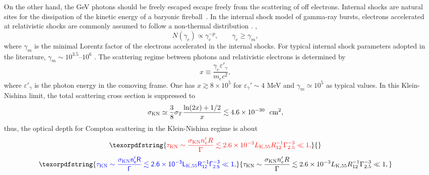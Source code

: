 \documentclass[prd,twocolumn,amsmath,amssymb,aps,linenumbers]{revtex4-2} %
\providecommand{\DIFaddtex}[1]{{\protect\color{blue} \sf #1}} %
\providecommand{\DIFdeltex}[1]{{\protect\color{red} \scriptsize #1}} %
\providecommand{\DIFaddbegin}{} %
\providecommand{\DIFaddend}{} %
\providecommand{\DIFdelbegin}{} %
\providecommand{\DIFdelend}{} %
\providecommand{\DIFadd}[1]{\texorpdfstring{\DIFaddtex{#1}}{#1}} %
\providecommand{\DIFdel}[1]{\texorpdfstring{\DIFdeltex{#1}}{}} %
\newcommand{\DIFscaledelfig}{0.5}
\newlength{\DIFdelgraphicswidth} %
\newlength{\DIFdelgraphicsheight} %
\newcommand{\DIFaddincludegraphics}[2][]{{\color{blue}\fbox{\DIFOincludegraphics[#1]{#2}}}} %
\newcommand{\DIFdelincludegraphics}[2][]{%
\sbox{\DIFdelgraphicsbox}{\DIFOincludegraphics[#1]{#2}}%
\settoboxwidth{\DIFdelgraphicswidth}{\DIFdelgraphicsbox} %
\settoboxtotalheight{\DIFdelgraphicsheight}{\DIFdelgraphicsbox} %
\scalebox{\DIFscaledelfig}{%
\parbox[b]{\DIFdelgraphicswidth}{\usebox{\DIFdelgraphicsbox}\\[-\baselineskip] \rule{\DIFdelgraphicswidth}{0em}}\llap{\resizebox{\DIFdelgraphicswidth}{\DIFdelgraphicsheight}{%
\setlength{\unitlength}{\DIFdelgraphicswidth}%
\begin{picture}(1,1)%
\thicklines\linethickness{2pt} %
{\color[rgb]{1,0,0}\put(0,0){\framebox(1,1){}}}%
{\color[rgb]{1,0,0}\put(0,0){\line( 1,1){1}}}%
{\color[rgb]{1,0,0}\put(0,1){\line(1,-1){1}}}%
\end{picture}%
}\hspace*{3pt}}} %
} %
\DeclareRobustCommand{\DIFaddbegin}{\DIFOaddbegin \let\includegraphics\DIFaddincludegraphics} %
\DeclareRobustCommand{\DIFaddend}{\DIFOaddend \let\includegraphics\DIFOincludegraphics} %
\DeclareRobustCommand{\DIFdelbegin}{\DIFOdelbegin \let\includegraphics\DIFdelincludegraphics} %
\DeclareRobustCommand{\DIFdelend}{\DIFOaddend \let\includegraphics\DIFOincludegraphics} %
\begin{document}
On the other hand, the GeV photons should \DIFdelbegin \DIFdel{be freely escaped }\DIFdelend \DIFaddbegin \DIFadd{escape freely }\DIFaddend from the scattering \DIFdelbegin \DIFdel{of }\DIFdelend \DIFaddbegin \DIFadd{off }\DIFaddend electrons. Internal shocks are natural sites for the dissipation of the kinetic energy of a baryonic fireball~\citep[][]{1990ApJ...365L..55S,1992MNRAS.258P..41R,1993ApJ...405..278M,1994ApJ...430L..93R}.
In the internal shock model of gamma-ray bursts, electrons accelerated at relativistic shocks are commonly assumed to follow a non-thermal distribution \cite{2004RvMP...76.1143P}\DIFdelbegin \DIFdel{.
}\DIFdelend \DIFaddbegin \DIFadd{,
}\DIFaddend \begin{equation}
N(\gamma_e) \propto \gamma_e^{-p}, \qquad \gamma_e \ge \gamma_m ,
\end{equation}
where $\gamma_m$ is the minimal Lorentz factor of the electrons accelerated in the internal shocks.
For typical internal shock parameters adopted in the literature, $\gamma_m \sim 10^{3.5}$--$10^6$ \cite{2013ApJ...769...69B,2019A&A...628A..59O}. The scattering regime between photons and relativistic electrons is determined by
\begin{equation}
x \equiv \frac{\gamma_e \varepsilon'_\gamma}{m_e c^2},
\end{equation}
where $\varepsilon'_\gamma$ is the photon energy in the comoving frame. One has $x \gtrsim 8\times 10^5$ for $\varepsilon_\gamma'\sim4$ MeV and $\gamma_m\simeq 10^{5}$ as typical values. In this Klein-Nishina limit, the total scattering cross section is suppressed to \cite{1986rpa..book.....R}
\begin{equation}
\sigma_{\rm KN} \simeq 
\frac{3}{8}\sigma_T
\frac{\ln(2x)+1/2}{x} 
\lesssim 4.6 \times 10^{-30}\ \ {\rm cm}^2,
\label{eq:sigmaKN-GBM}
\end{equation}
thus, the optical depth for Compton scattering in the Klein-Nishina regime is
\DIFdelbegin \DIFdel{about 
}\begin{displaymath}
\DIFdel{\tau_{\rm KN} \sim \frac{\sigma_{\rm KN} n'_e R}{\Gamma}
\lesssim 2.6\times10^{-3} L_{\rm K, 55}R_{12}^{-1} \Gamma_{2.5}^{-3}\ll 1,
}\end{displaymath}%
\DIFdelend \DIFaddbegin \begin{equation}
\DIFadd{\tau_{\rm KN} \sim \frac{\sigma_{\rm KN} n'_e R}{\Gamma}
\lesssim 2.6\times10^{-3} L_{\rm K, 55}R_{12}^{-1} \Gamma_{2.5}^{-3}\ll 1,
\label{eq:tauKN-GBM}
}\end{equation}\DIFaddend 
\end{document}
